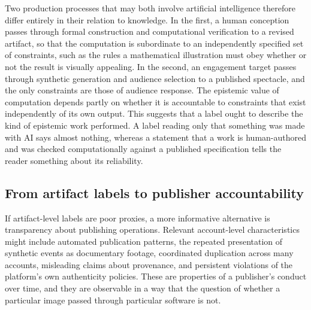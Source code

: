 \documentclass[12pt]{article}
\theoremstyle{plain}
\theoremstyle{definition}
\theoremstyle{remark}
\begin{document}
Two production processes that may both involve artificial intelligence therefore differ entirely in their relation to knowledge. In the first, a human conception passes through formal construction and computational verification to a revised artifact, so that the computation is subordinate to an independently specified set of constraints, such as the rules a mathematical illustration must obey whether or not the result is visually appealing. In the second, an engagement target passes through synthetic generation and audience selection to a published spectacle, and the only constraints are those of audience response. The epistemic value of computation depends partly on whether it is accountable to constraints that exist independently of its own output. This suggests that a label ought to describe the kind of epistemic work performed. A label reading only that something was made with AI says almost nothing, whereas a statement that a work is human-authored and was checked computationally against a published specification tells the reader something about its reliability.

\subsection{From artifact labels to publisher accountability}

If artifact-level labels are poor proxies, a more informative alternative is transparency about publishing operations. Relevant account-level characteristics might include automated publication patterns, the repeated presentation of synthetic events as documentary footage, coordinated duplication across many accounts, misleading claims about provenance, and persistent violations of the platform's own authenticity policies. These are properties of a publisher's conduct over time, and they are observable in a way that the question of whether a particular image passed through particular software is not.
\end{document}
